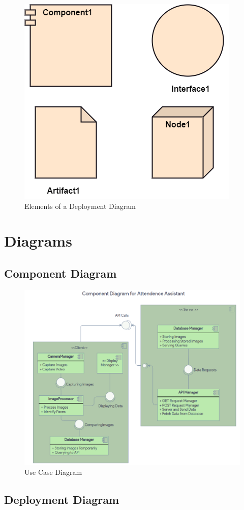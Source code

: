 \documentclass[11pt]{article}
\begin{document}
\begin{figure}[H]
	\centering
	\includegraphics[width=.45\textwidth]{uml-deployment-diagram.png}
	\caption{Elements of a Deployment Diagram}
\end{figure}

\clearpage

\section{Diagrams}

\subsection{Component Diagram}

\begin{figure}[H]
\centering
\includegraphics[width=.95\textwidth]{component diagram.png}
\caption{Use Case Diagram}
\end{figure}

\subsection{Deployment Diagram}
\end{document}

